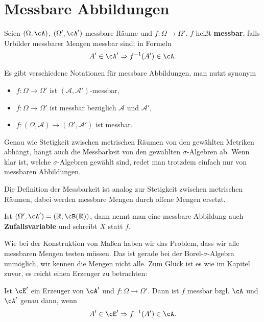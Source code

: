 \section{Messbare Abbildungen}

\begin{deff}
	Seien $(\Omega, \cA)$, $(\Omega', \cA')$ messbare Räume und $f \! : \Omega \rightarrow \Omega'$. $f$ heißt \mbox{\textbf{messbar}}, falls Urbilder messbarer Mengen messbar sind; in Formeln \[A' \in \cA' \Rightarrow f^{-1} (A') \in \cA.\]
\end{deff}
	Es gibt verschiedene Notationen f\"ur messbare Abbildungen, man nutzt synonym 
	\begin{itemize}
		\item $f:\Omega \to \Omega'$ ist $(\mathcal A, \mathcal A')$-messbar,
		\item $f:\Omega\to \Omega'$ ist messbar bez\"uglich $\mathcal A$ und $\mathcal A'$,
		\item $f: (\Omega, \mathcal A)\to (\Omega',\mathcal A')$ ist messbar.
	\end{itemize}
	Genau wie Stetigkeit zwischen metrischen R\"aumen von den gew\"ahlten Metriken abh\"angt, h\"angt auch die Messbarkeit von den gew\"ahlten $\sigma$-Algebren ab. Wenn klar ist, welche $\sigma$-Algebren gew\"ahlt sind, redet man trotzdem einfach nur von messbaren Abbildungen.
\begin{bem}
	Die Definition der Messbarkeit ist analog zur Stetigkeit zwischen metrischen Räumen, dabei werden messbare Mengen durch offene Mengen ersetzt.
\end{bem}

\begin{deff}
	Ist $ (\Omega', \cA') = (\mathbb{R}, \cB(\mathbb{R})) $, dann nennt man eine messbare Abbildung auch \textbf{Zufallsvariable} und schreibt $X$ statt $f$.
\end{deff}
Wie bei der Konstruktion von Ma\ss en haben wir das Problem, dass wir alle messbaren Mengen testen m\"ussen. Das ist gerade bei der Borel-$\sigma$-Algebra unm\"oglich, wir kennen die Mengen nicht alle. Zum Gl\"uck ist es wie im Kapitel zuvor, es reicht einen Erzeuger zu betrachten:
\begin{satz}\label{S2}
	Ist $\cE'$ ein Erzeuger von $\cA'$ und $f \! : \Omega \rightarrow \Omega'$. Dann ist $f$ messbar bzgl. $\cA$ und $\cA'$ genau dann, wenn \[ A' \in \cE' \Rightarrow f^{-1} (A') \in \cA. \]
\end{satz}

